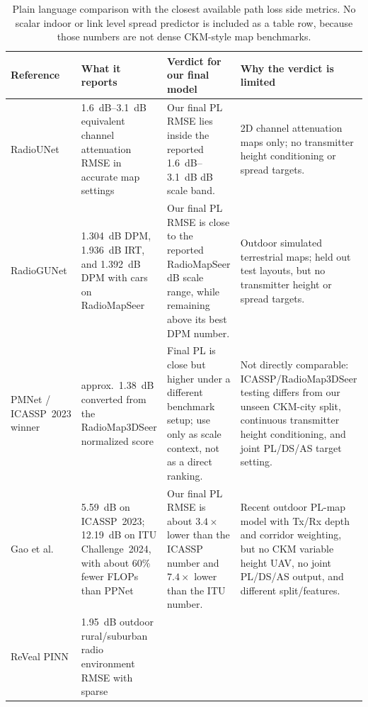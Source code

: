 \begin{table}[!htbp]
\centering
\caption[Plain language comparison with closest path loss metrics.]%
{Plain language comparison with the closest available path loss side metrics.
No scalar indoor or link level spread predictor is included as a table row,
because those numbers are not dense CKM-style map benchmarks.}
\label{tab:soa_result_comparison}
\begingroup
\scriptsize
\setlength{\tabcolsep}{3pt}
\renewcommand{\arraystretch}{0.98}
\begin{tabularx}{\textwidth}{>{\raggedright\arraybackslash}p{}
>{\raggedright\arraybackslash}p{}
>{\raggedright\arraybackslash}p{}
>{\raggedright\arraybackslash}X}
\toprule
Reference & What it reports & Verdict for our final model & Why the verdict is limited \\
\midrule
RadioUNet \cite{radiounet2020} &
\SI{1.6}{dB}--\SI{3.1}{dB} equivalent channel attenuation RMSE in accurate map settings &
Our final PL RMSE lies inside the reported \SI{1.6}{dB}--\SI{3.1}{dB}
dB scale band. &
2D channel attenuation maps only; no transmitter height conditioning or spread targets. \\
RadioGUNet \cite{radiogunet2025} &
\SI{1.304}{dB} DPM, \SI{1.936}{dB} IRT, and \SI{1.392}{dB} DPM with cars on
RadioMapSeer &
Our final PL RMSE is close to the reported RadioMapSeer dB scale range, while
remaining above its best DPM number. &
Outdoor simulated terrestrial maps; held out test layouts, but no transmitter height or
spread targets. \\
PMNet / ICASSP~2023 winner \cite{pmnet_icassp2023,icassp2023challenge} &
approx.\ \SI{1.38}{dB} converted from the RadioMap3DSeer normalized score &
Final PL is close but higher under a different benchmark setup; use only as
scale context, not as a direct ranking. &
Not directly comparable: ICASSP/RadioMap3DSeer testing differs from our unseen
CKM-city split, continuous transmitter height conditioning, and joint PL/DS/AS target
setting. \\
Gao et al.\ \cite{gao2026} &
\SI{5.59}{dB} on ICASSP~2023; \SI{12.19}{dB} on ITU Challenge~2024, with
about 60\% fewer FLOPs than PPNet &
Our final PL RMSE is about \(3.4\times\) lower than the ICASSP number and
\(7.4\times\) lower than the ITU number. &
Recent outdoor PL-map model with Tx/Rx depth and corridor weighting, but no
CKM variable height UAV, no joint PL/DS/AS output, and different split/features. \\
ReVeal PINN \cite{reveal2025} &
\SI{1.95}{dB} outdoor rural/suburban radio environment RMSE with sparse

\end{tabularx}
\end{table}
